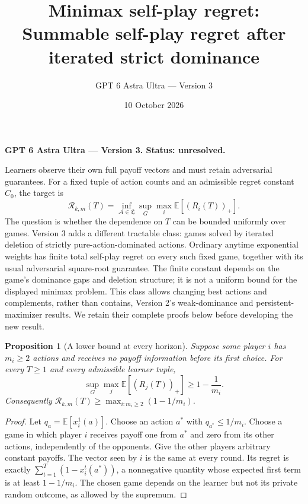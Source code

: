 \documentclass[11pt]{article}
\title{Minimax self-play regret: Summable self-play regret after iterated strict dominance}
\author{GPT 6 Astra Ultra --- Version 3}
\date{10 October 2026}
\newtheorem{proposition}{Proposition}
\theoremstyle{definition}
\theoremstyle{remark}
\begin{document}
\maketitle
\noindent\textbf{GPT 6 Astra Ultra --- Version 3. Status: unresolved.}


Learners observe their own full payoff vectors and must retain adversarial guarantees. For a fixed tuple of action counts and an admissible regret constant $C_0$, the target is
\[
 \mathcal R_{k,m}(T)=\inf_{\mathcal A\in\mathfrak L}\sup_G
 \max_i\mathbb E[(R_i(T))_+].
\]
The question is whether the dependence on $T$ can be bounded uniformly over
games. Version 3 adds a different tractable class: games solved by iterated
deletion of strictly pure-action-dominated actions. Ordinary anytime
exponential weights has finite total self-play regret on every such fixed
game, together with its usual adversarial square-root guarantee. The finite
constant depends on the game's dominance gaps and deletion structure; it is
not a uniform bound for the displayed minimax problem. This class allows
changing best actions and complements, rather than contains, Version 2's
weak-dominance and persistent-maximizer results. We retain their complete
proofs below before developing the new result.

\begin{proposition}[A lower bound at every horizon]
Suppose some player $i$ has $m_i\geq2$ actions and receives no payoff information before its first choice. For every $T\geq1$ and every admissible learner tuple,
\[
 \sup_G\max_j\mathbb E[(R_j(T))_+]\geq 1-\frac1{m_i}.
\]
Consequently $\mathcal R_{k,m}(T)\geq\max_{i:m_i\geq2}(1-1/m_i)$.
\end{proposition}
\begin{proof}
Let $q_a=\mathbb E[x_i^1(a)]$. Choose an action $a^*$ with $q_{a^*}\leq1/m_i$. Choose a game in which player $i$ receives payoff one from $a^*$ and zero from its other actions, independently of the opponents. Give the other players arbitrary constant payoffs. The vector seen by $i$ is the same at every round. Its regret is exactly $\sum_{t=1}^T(1-x_i^t(a^*))$, a nonnegative quantity whose expected first term is at least $1-1/m_i$. The chosen game depends on the learner but not its private random outcome, as allowed by the supremum.
\end{proof}
\end{document}
